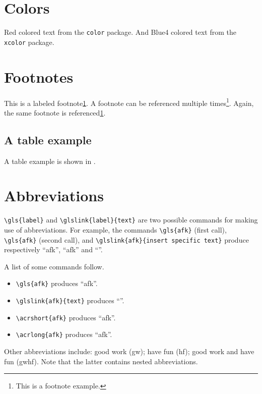\section{Colors}
\label{sec:colors}

{\color{red} Red colored text} from the \texttt{color} package.
{\color{Blue4} And Blue4 colored text} from the \texttt{xcolor} package.

\section{Footnotes}
\label{sec:footnotes}

This is a labeled footnote\cref{foot:example}. A footnote can be referenced multiple times\footnote{\label{foot:example}This is a footnote example.}. Again, the same footnote is referenced\cref{foot:example}.

\subsection{A table example}
\label{ssec:a-table-example}

A table example is shown in .



\section{Abbreviations}
\label{sec:abbreviations}

\verb+\gls{label}+ and \verb+\glslink{label}{text}+ are two possible commands for making use of abbreviations. For example, the commands \verb+\gls{afk}+ (first call), \verb+\gls{afk}+ (second call), and \verb+\glslink{afk}{insert specific text}+ produce respectively ``\gls{afk}'', ``\gls{afk}'' and ``''.

A list of some commands follow.

\begin{itemize}
\item
\verb+\gls{afk}+ produces ``\gls{afk}''.
\item
\verb+\glslink{afk}{text}+ produces ``''.
\item
\verb+\acrshort{afk}+ produces ``\acrshort{afk}''.
\item
\verb+\acrlong{afk}+ produces ``\acrlong{afk}''.
\end{itemize}

Other abbreviations include: good work (\acrshort{gw}); have fun (\acrshort{hf}); good work and have fun (\acrshort{gwhf}). Note that the latter contains nested abbreviations.


